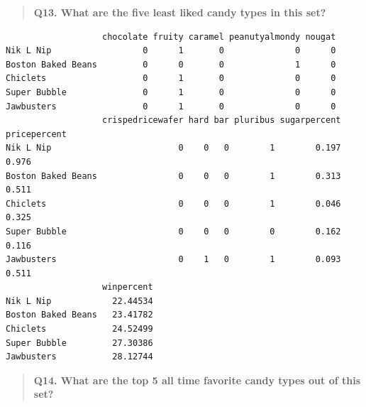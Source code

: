 \documentclass[
  letterpaper,
  DIV=11,
  numbers=noendperiod]{scrartcl}
\newenvironment{Shaded}{\begin{snugshade}}{\end{snugshade}}
\newcommand{\AttributeTok}[1]{\textcolor[rgb]{0.40,0.45,0.13}{#1}}
\newcommand{\DecValTok}[1]{\textcolor[rgb]{0.68,0.00,0.00}{#1}}
\newcommand{\FunctionTok}[1]{\textcolor[rgb]{0.28,0.35,0.67}{#1}}
\newcommand{\NormalTok}[1]{\textcolor[rgb]{0.00,0.23,0.31}{#1}}
\newcommand{\SpecialCharTok}[1]{\textcolor[rgb]{0.37,0.37,0.37}{#1}}
\begin{document}
\begin{quote}
\textbf{Q13. What are the five least liked candy types in this set?}
\end{quote}

\begin{Shaded}
\end{Shaded}

\begin{verbatim}
                   chocolate fruity caramel peanutyalmondy nougat
Nik L Nip                  0      1       0              0      0
Boston Baked Beans         0      0       0              1      0
Chiclets                   0      1       0              0      0
Super Bubble               0      1       0              0      0
Jawbusters                 0      1       0              0      0
                   crispedricewafer hard bar pluribus sugarpercent pricepercent
Nik L Nip                         0    0   0        1        0.197        0.976
Boston Baked Beans                0    0   0        1        0.313        0.511
Chiclets                          0    0   0        1        0.046        0.325
Super Bubble                      0    0   0        0        0.162        0.116
Jawbusters                        0    1   0        1        0.093        0.511
                   winpercent
Nik L Nip            22.44534
Boston Baked Beans   23.41782
Chiclets             24.52499
Super Bubble         27.30386
Jawbusters           28.12744
\end{verbatim}

\begin{quote}
\textbf{Q14. What are the top 5 all time favorite candy types out of
this set?}
\end{quote}

\begin{Shaded}
\end{Shaded}
\end{document}
